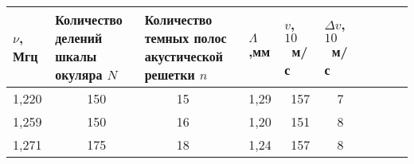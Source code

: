 \begin{tabular}{|p{0.7cm}|p{2cm}|p{2cm}|p{0.7cm}|p{0.83cm}|p{0.83cm}|c|c|c|c|}
\hline
 \hspace{5pt}$\nu$\hspace{2pt}, Мгц& Количество делений шкалы окуляра $N$&Количество темных полос акустической решетки $n$&\vspace{0.5cm} \hspace{6pt}$\Lambda$,мм&\vspace{0.45cm} \hspace{10pt}$v$, $10$~м/с&\vspace{0.41cm} $\Delta v$, $10$~м/с\\
\hline
1,220&~~~~~150&~~~~~15&1,29&~157&~~7\\
\hline
1,259&~~~~~150&~~~~~16&1,20&~151&~~8\\
\hline
1,271&~~~~~175&~~~~~18&1,24&~157&~~8\\
\hline
\end{tabular}